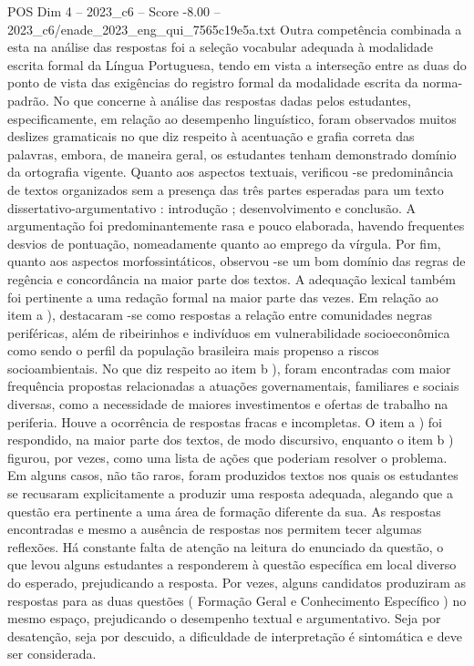 \begin{textsample}{POS Dim 4 – 2023\_c6 – Score -8.00 – 2023\_c6/enade\_2023\_eng\_qui\_7565c19e5a.txt}
Outra competência combinada a esta na análise das respostas foi a seleção vocabular adequada à modalidade escrita formal da Língua Portuguesa, tendo em vista a interseção entre as duas do ponto de vista das exigências do registro formal da modalidade escrita da norma-padrão.
No que concerne à análise das respostas dadas pelos estudantes, especificamente, em relação ao desempenho linguístico, foram observados muitos deslizes gramaticais no que diz respeito à acentuação e grafia correta das palavras, embora, de maneira geral, os estudantes tenham demonstrado domínio da ortografia vigente.
Quanto aos aspectos textuais, verificou -se predominância de textos organizados sem a presença das três partes esperadas para um texto dissertativo-argumentativo : introdução ; desenvolvimento e conclusão.
A argumentação foi predominantemente rasa e pouco elaborada, havendo frequentes desvios de pontuação, nomeadamente quanto ao emprego da vírgula.
Por fim, quanto aos aspectos morfossintáticos, observou -se um bom domínio das regras de regência e concordância na maior parte dos textos.
A adequação lexical também foi pertinente a uma redação formal na maior parte das vezes.
Em relação ao item a ), destacaram -se como respostas a relação entre comunidades negras periféricas, além de ribeirinhos e indivíduos em vulnerabilidade socioeconômica como sendo o perfil da população brasileira mais propenso a riscos socioambientais.
No que diz respeito ao item b ), foram encontradas com maior frequência propostas relacionadas a atuações governamentais, familiares e sociais diversas, como a necessidade de maiores investimentos e ofertas de trabalho na periferia.
Houve a ocorrência de respostas fracas e incompletas.
O item a ) foi respondido, na maior parte dos textos, de modo discursivo, enquanto o item b ) figurou, por vezes, como uma lista de ações que poderiam resolver o problema.
Em alguns casos, não tão raros, foram produzidos textos nos quais os estudantes se recusaram explicitamente a produzir uma resposta adequada, alegando que a questão era pertinente a uma área de formação diferente da sua.
As respostas encontradas e mesmo a ausência de respostas nos permitem tecer algumas reflexões.
Há constante falta de atenção na leitura do enunciado da questão, o que levou alguns estudantes a responderem à questão específica em local diverso do esperado, prejudicando a resposta.
Por vezes, alguns candidatos produziram as respostas para as duas questões ( Formação Geral e Conhecimento Específico ) no mesmo espaço, prejudicando o desempenho textual e argumentativo.
Seja por desatenção, seja por descuido, a dificuldade de interpretação é sintomática e deve ser considerada.

\end{textsample}
